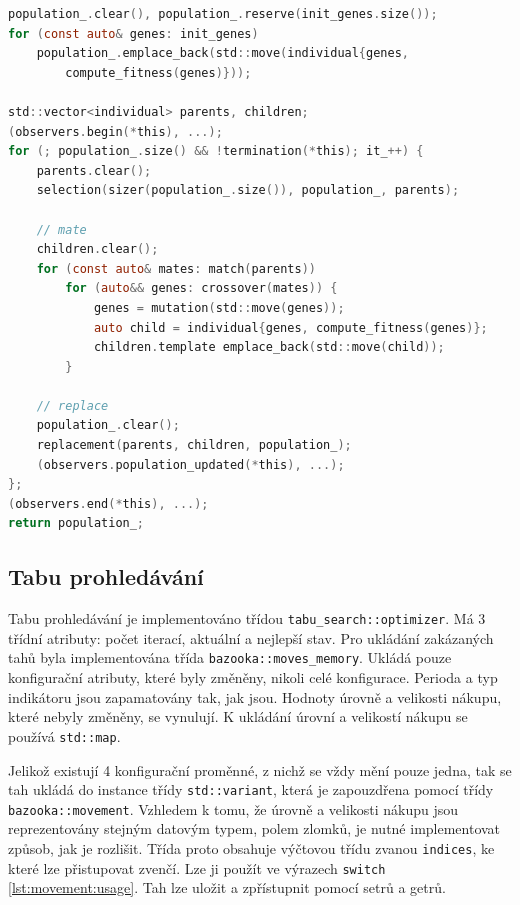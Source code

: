 \begin{lstlisting}[caption={~Implementace genetického algoritmu},label={lst:genetic:algorithm},captionpos=t,abovecaptionskip=-\medskipamount,belowcaptionskip=\medskipamount,language=C]
population_.clear(), population_.reserve(init_genes.size());
for (const auto& genes: init_genes)
    population_.emplace_back(std::move(individual{genes,
        compute_fitness(genes)}));

std::vector<individual> parents, children;
(observers.begin(*this), ...);
for (; population_.size() && !termination(*this); it_++) {
    parents.clear();
    selection(sizer(population_.size()), population_, parents);

    // mate
    children.clear();
    for (const auto& mates: match(parents))
        for (auto&& genes: crossover(mates)) {
            genes = mutation(std::move(genes));
            auto child = individual{genes, compute_fitness(genes)};
            children.template emplace_back(std::move(child));
        }

    // replace
    population_.clear();
    replacement(parents, children, population_);
    (observers.population_updated(*this), ...);
};
(observers.end(*this), ...);
return population_;
\end{lstlisting}

\subsection{Tabu prohledávání}
Tabu prohledávání je implementováno třídou \texttt{tabu\_search::optimizer}.
Má 3 třídní atributy: počet iterací, aktuální a nejlepší stav.
Pro ukládání zakázaných tahů byla implementována třída \texttt{bazooka::moves\_memory}.
Ukládá pouze konfigurační atributy, které byly změněny, nikoli celé konfigurace.
Perioda a typ indikátoru jsou zapamatovány tak, jak jsou.
Hodnoty úrovně a velikosti nákupu, které nebyly změněny, se vynulují.
K ukládání úrovní a velikostí nákupu se používá \texttt{std::map}.

Jelikož existují 4 konfigurační proměnné, z nichž se vždy mění pouze jedna, tak se tah ukládá do instance třídy \texttt{std::variant}, která je zapouzdřena pomocí třídy \texttt{bazooka::movement}.
Vzhledem k tomu, že úrovně a velikosti nákupu jsou reprezentovány stejným datovým typem, polem zlomků, je nutné implementovat způsob, jak je rozlišit.
Třída proto obsahuje výčtovou třídu zvanou \texttt{indices}, ke které lze přistupovat zvenčí.
Lze ji použít ve výrazech \texttt{switch} \ref{lst:movement:usage}.
Tah lze uložit a zpřístupnit pomocí setrů a getrů.

